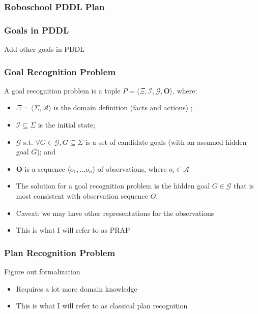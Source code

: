 \documentclass{beamer}
\newcommand{\todo}[1]{ {\color{red} #1} }
\begin{document}
	\begin{frame}[c]\frametitle{Roboschool PDDL Plan}
		
	\end{frame}
	
	\begin{frame}[c]\frametitle{Goals in PDDL}
		\todo{Add other goals in PDDL}
	\end{frame}

    \begin{frame}[c]\frametitle{Goal Recognition Problem}
		\begin{definition}
			A goal recognition problem is a tuple $P = \langle \Xi, \mathcal{I}, \mathcal{G}, \mathbf{O} \rangle$, where:
       	\begin{itemize}
       		\item $\Xi = \langle \Sigma, \mathcal{A} \rangle$ is the domain definition (facts and actions) ;
       		\item $\mathcal{I} \subseteq \Sigma$ is the initial state;
       		\item $\mathcal{G}$ s.t. $\forall{G \in \mathcal{G}}, G \subseteq \Sigma$ is a set of candidate goals (with an assumed hidden goal $G$); and
       		\item $\mathbf{O}$ is a sequence $\langle o_1, \dots o_n \rangle$ of observations, where $o_i \in \mathcal{A}$
       	\end{itemize}
       	\end{definition}
        
        \begin{itemize}
        	\item The solution for a goal recognition problem is the hidden goal $G \in \mathcal{G}$ that is most consistent with observation sequence $O$.
        	\item Caveat: we may have other representations for the observations
        	\item This is what I will refer to as PRAP
        \end{itemize}
    \end{frame}	
 
	\begin{frame}[c]\frametitle{Plan Recognition Problem}
		\begin{definition}
			\todo{Figure out formalization}
		\end{definition}
		
		\begin{itemize}
			\item Requires a lot more domain knowledge
			\item This is what I will refer to as classical plan recognition 
		\end{itemize}
	\end{frame}
	
\end{document}
